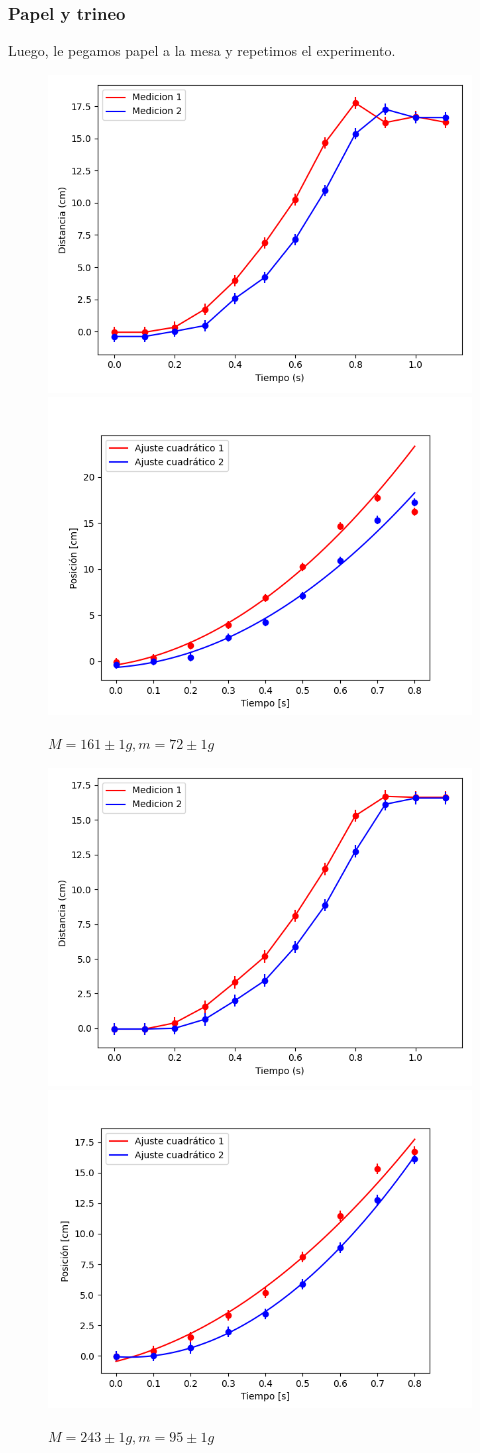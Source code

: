 \documentclass[12pt,a4]{article}
\begin{document}
\subsubsection*{Papel y trineo}

Luego, le pegamos papel a la mesa y repetimos el experimento.

\begin{figure}[H]
    \centering
    \includegraphics[width=0.4\linewidth]{TiempoVsDistanciaPisoHoja2PB_O.png}
    \includegraphics[width=0.44\linewidth]{ajuste2_PisoHoja2PB_O.png}
    \caption{$M = 161 \pm 1 g, m = 72 \pm 1 g$}
    \label{fig:2PB_O piso hoja}
\end{figure}

\begin{figure}[H]
    \centering
    \includegraphics[width=0.4\linewidth]{TiempoVsDistanciaPisoHojaM_OP.png}
    \includegraphics[width=0.44\linewidth]{ajuste2_PisoHojaM_OP.png}
    \caption{$M = 243 \pm 1 g, m = 95 \pm 1 g$}
    \label{fig:M_OP piso hoja}
\end{figure}
\end{document}
